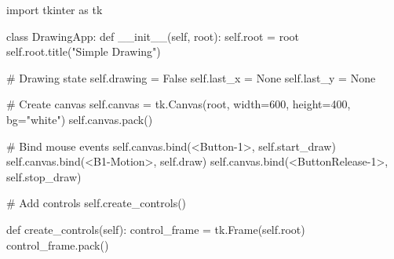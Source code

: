 \documentclass[
  letterpaper,
  DIV=11,
  numbers=noendperiod,
  oneside]{scrreprt}
\newenvironment{Shaded}{}{}
\newcommand{\CommentTok}[1]{\textcolor[rgb]{0.42,0.45,0.49}{#1}}
\newcommand{\DecValTok}[1]{\textcolor[rgb]{0.00,0.36,0.77}{#1}}
\newcommand{\FunctionTok}[1]{\textcolor[rgb]{0.44,0.26,0.76}{#1}}
\newcommand{\ImportTok}[1]{\textcolor[rgb]{0.01,0.18,0.38}{#1}}
\newcommand{\KeywordTok}[1]{\textcolor[rgb]{0.84,0.23,0.29}{#1}}
\newcommand{\NormalTok}[1]{\textcolor[rgb]{0.14,0.16,0.18}{#1}}
\newcommand{\OperatorTok}[1]{\textcolor[rgb]{0.14,0.16,0.18}{#1}}
\newcommand{\StringTok}[1]{\textcolor[rgb]{0.01,0.18,0.38}{#1}}
\newcommand{\VariableTok}[1]{\textcolor[rgb]{0.89,0.38,0.04}{#1}}
\begin{document}
\begin{Shaded}
\begin{Highlighting}[]
\ImportTok{import}\NormalTok{ tkinter }\ImportTok{as}\NormalTok{ tk}

\KeywordTok{class}\NormalTok{ DrawingApp:}
    \KeywordTok{def} \FunctionTok{\_\_init\_\_}\NormalTok{(}\VariableTok{self}\NormalTok{, root):}
        \VariableTok{self}\NormalTok{.root }\OperatorTok{=}\NormalTok{ root}
        \VariableTok{self}\NormalTok{.root.title(}\StringTok{"Simple Drawing"}\NormalTok{)}
        
        \CommentTok{\# Drawing state}
        \VariableTok{self}\NormalTok{.drawing }\OperatorTok{=} \VariableTok{False}
        \VariableTok{self}\NormalTok{.last\_x }\OperatorTok{=} \VariableTok{None}
        \VariableTok{self}\NormalTok{.last\_y }\OperatorTok{=} \VariableTok{None}
        
        \CommentTok{\# Create canvas}
        \VariableTok{self}\NormalTok{.canvas }\OperatorTok{=}\NormalTok{ tk.Canvas(root, width}\OperatorTok{=}\DecValTok{600}\NormalTok{, height}\OperatorTok{=}\DecValTok{400}\NormalTok{, bg}\OperatorTok{=}\StringTok{"white"}\NormalTok{)}
        \VariableTok{self}\NormalTok{.canvas.pack()}
        
        \CommentTok{\# Bind mouse events}
        \VariableTok{self}\NormalTok{.canvas.bind(}\StringTok{\textquotesingle{}\textless{}Button{-}1\textgreater{}\textquotesingle{}}\NormalTok{, }\VariableTok{self}\NormalTok{.start\_draw)}
        \VariableTok{self}\NormalTok{.canvas.bind(}\StringTok{\textquotesingle{}\textless{}B1{-}Motion\textgreater{}\textquotesingle{}}\NormalTok{, }\VariableTok{self}\NormalTok{.draw)}
        \VariableTok{self}\NormalTok{.canvas.bind(}\StringTok{\textquotesingle{}\textless{}ButtonRelease{-}1\textgreater{}\textquotesingle{}}\NormalTok{, }\VariableTok{self}\NormalTok{.stop\_draw)}
        
        \CommentTok{\# Add controls}
        \VariableTok{self}\NormalTok{.create\_controls()}
        
    \KeywordTok{def}\NormalTok{ create\_controls(}\VariableTok{self}\NormalTok{):}
\NormalTok{        control\_frame }\OperatorTok{=}\NormalTok{ tk.Frame(}\VariableTok{self}\NormalTok{.root)}
\NormalTok{        control\_frame.pack()}
        

\end{Highlighting}
\end{Shaded}
\end{document}
